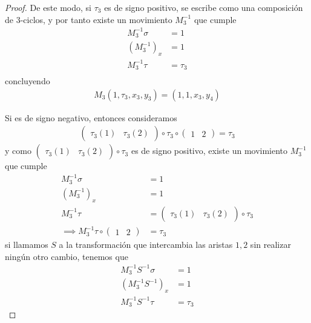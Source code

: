 \documentclass{article}
\theoremstyle{definition}
\begin{document}
\begin{proof}
    De este modo, si $\tau_3$ es de signo positivo, se escribe como una composición de 3-ciclos, y por tanto existe un movimiento $M_3^{-1}$ que cumple
    \begin{align*}
        M_3^{-1}\sigma & =1                   \\
        (M_3^{-1})_x   & =1                   \\
        M_3^{-1}\tau   & =\tau_3\\
    \end{align*}
    concluyendo
    \begin{align*}
        M_3(1,\tau_3,x_3,y_3)=(1,1,x_3,y_4)
    \end{align*}

    Si es de signo negativo, entonces consideramos
    \begin{align*}
        \begin{pmatrix}\tau_3(1)&\tau_3(2)\end{pmatrix} \circ \tau_3\circ \begin{pmatrix}
            1&2
        \end{pmatrix}=\tau_3
    \end{align*}
    y como $\begin{pmatrix} \tau_3(1)&\tau_3(2) \end{pmatrix}\circ \tau_3$ es de signo positivo, existe un movimiento $M_3^{-1}$ que cumple
    \begin{align*}
        M_3^{-1}\sigma & =1                   \\
        (M_3^{-1})_x   & =1                   \\
        M_3^{-1}\tau   & =\begin{pmatrix}
                             \tau_3(1) & \tau_3(2)
                         \end{pmatrix}\circ\tau_3\\
        \implies M_3^{-1}\tau\circ\begin{pmatrix}
            1 & 2
        \end{pmatrix}&=\tau_3
    \end{align*}
    si llamamos $S$ a la transformación que intercambia las aristas $1,2$ sin realizar ningún otro cambio, tenemos que
    \begin{align*}
        M_3^{-1}S^{-1}\sigma & =1                   \\
        (M_3^{-1}S^{-1})_x   & =1                   \\
        M_3^{-1}S^{-1}\tau   & =\tau_3
    \end{align*}

\end{proof}
\end{document}
